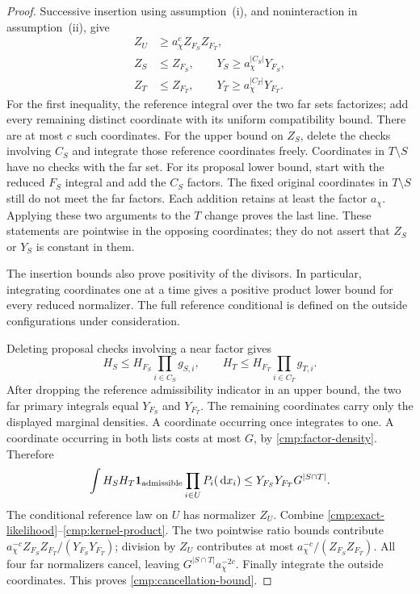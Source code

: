 \begin{proof}
Successive insertion using assumption~\textup{(i)}, and noninteraction in
assumption~\textup{(ii)}, give
\begin{align}
 Z_U&\ge a_\chi^c Z_{F_S}Z_{F_T},
       \label{cmp:union-normalizer}\\
 Z_S&\le Z_{F_S},\qquad
 Y_S\ge a_\chi^{|C_S|}Y_{F_S},
       \label{cmp:single-normalizers}\\
 Z_T&\le Z_{F_T},\qquad
 Y_T\ge a_\chi^{|C_T|}Y_{F_T}.
       \label{cmp:other-normalizers}
\end{align}
For the first inequality, the reference integral over the two far sets
factorizes; add every remaining distinct coordinate with its uniform
compatibility bound. There are at most $c$ such coordinates. For the upper
bound on $Z_S$, delete the checks involving $C_S$ and integrate those reference
coordinates freely. Coordinates in $T\setminus S$ have no checks with the
far set. For its proposal lower bound, start with the reduced $F_S$ integral
and add the $C_S$ factors. The fixed original coordinates in
$T\setminus S$ still do not meet the far factors. Each addition retains at
least the factor $a_\chi$. Applying these two arguments to the $T$ change proves the
last line. These statements are pointwise in the opposing coordinates;
they do not assert that $Z_S$ or $Y_S$ is constant in them.

The insertion bounds also prove positivity of the divisors. In particular,
integrating coordinates one at a time gives a positive product lower bound
for every reduced normalizer. The full reference conditional is defined on
the outside configurations under consideration.

Deleting proposal checks involving a near factor gives
\[
 H_S\le H_{F_S}\prod_{i\in C_S}g_{S,i},
 \qquad
 H_T\le H_{F_T}\prod_{i\in C_T}g_{T,i}.
\]
After dropping the reference admissibility indicator in an upper bound,
the two far primary integrals equal $Y_{F_S}$ and $Y_{F_T}$. The remaining
coordinates carry only the displayed marginal densities. A coordinate
occurring once integrates to one. A coordinate occurring in both lists
costs at most $G$, by \eqref{cmp:factor-density}. Therefore
\begin{equation}\label{cmp:kernel-product}
 \int H_SH_T\mathbf 1_{\mathrm{admissible}}
              \prod_{i\in U}P_i(\,\mathrm d x_i)
 \le Y_{F_S}Y_{F_T}G^{|S\cap T|}.
\end{equation}
The conditional reference law on $U$ has normalizer $Z_U$. Combine
\eqref{cmp:exact-likelihood}--\eqref{cmp:kernel-product}. The two pointwise
ratio bounds contribute
$a_\chi^{-c}Z_{F_S}Z_{F_T}/(Y_{F_S}Y_{F_T})$; division by $Z_U$
contributes at most $a_\chi^{-c}/(Z_{F_S}Z_{F_T})$. All four far
normalizers cancel, leaving $G^{|S\cap T|}a_\chi^{-2c}$.
Finally integrate the outside coordinates. This proves
\eqref{cmp:cancellation-bound}.
\end{proof}

